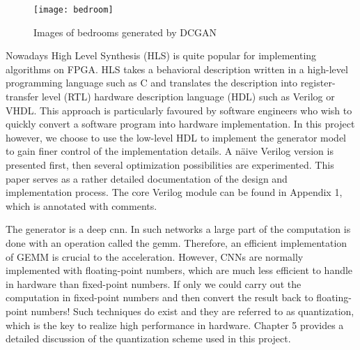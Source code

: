 \begin{figure}[h]
  \centering
  \texttt{[image: bedroom]}
  \caption{Images of bedrooms generated by DCGAN}
  \label{fig:bedroom}
\end{figure}

Nowadays High Level Synthesis (HLS) is quite popular for implementing algorithms on FPGA. HLS takes a
behavioral description written in a high-level programming language such as C and translates the description
into register-transfer level (RTL) hardware description language (HDL) such as Verilog or VHDL. This approach
is particularly favoured by software engineers who wish to quickly convert a software program into
hardware implementation. In this project however, we choose to use the low-level HDL to implement the
generator model to gain finer control of the implementation details. A näive Verilog version is presented
first, then several optimization possibilities are experimented. This paper serves as a rather detailed
documentation of the design and implementation process. The core Verilog module can be found in Appendix 1,
which is annotated with comments.

The generator is a deep \gls{cnn}. In such networks a large part of the computation is done with an
operation called the \gls{gemm}. Therefore, an efficient implementation of GEMM is crucial to the
acceleration. However, CNNs are normally implemented with floating-point numbers, which are much less
efficient to handle in hardware than fixed-point numbers. If only we could carry out the computation in
fixed-point numbers and then convert the result back to floating-point numbers! Such techniques do exist
and they are referred to as quantization, which is the key to realize high performance in hardware. Chapter 5
provides a detailed discussion of the quantization scheme used in this project.

\clearpage %
